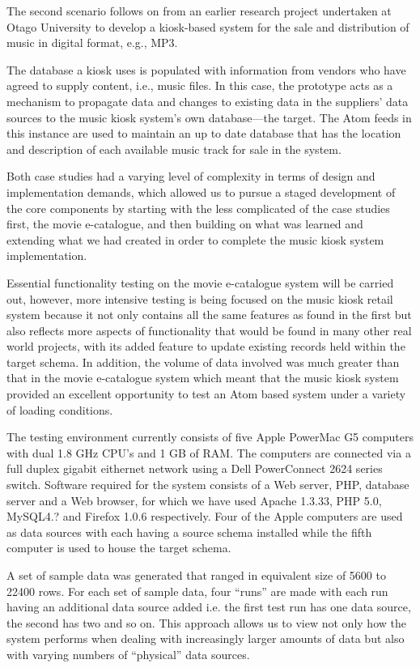\documentclass{CRPITStyle}
\begin{document}
The second scenario follows on from an earlier research project undertaken
at Otago University to develop a kiosk-based system for the sale and 
distribution of music in digital format, e.g., MP3.

The database a kiosk uses is populated with information from vendors who
have agreed to supply content, i.e., music files. In this case, the
prototype acts as a mechanism to propagate data and changes to existing
data in the suppliers' data sources to the music kiosk system's own
database---the target. The Atom feeds in this instance are used to
maintain an up to date database that has the location and description of
each available music track for sale in the system.

Both case studies had a varying level of complexity in terms of design
and implementation demands, which allowed us to pursue a staged
development of the core components by starting with the less complicated
of the case studies first, the movie e-catalogue, and then building on 
what was learned and extending what we had created in order to complete 
the music kiosk system implementation.

Essential functionality testing on the movie e-catalogue system will be
carried out, however, more intensive testing is being focused on the 
music kiosk retail system because it not only contains all the same 
features as found in the first but also reflects more aspects of 
functionality that would be found in many other real world projects, with
its added feature to update existing records held within the target schema.
In addition, the volume of data involved was much greater than that in the
movie e-catalogue system which meant that the music kiosk system provided
an excellent opportunity to test an Atom based system under a variety of 
loading conditions.

The testing environment currently consists of five Apple PowerMac G5
computers with dual 1.8 GHz CPU's and 1 GB of RAM. The computers are 
connected via a full duplex gigabit eithernet network using a Dell PowerConnect
2624 series switch. Software required for the system consists of a Web server,
PHP, database server and a Web browser, for which we have used Apache 1.3.33, 
PHP 5.0, MySQL4.? and Firefox 1.0.6 respectively. Four of the Apple computers 
are used as data sources with each having a source schema installed while the 
fifth computer is used to house the target schema. 

A set of sample data was generated that ranged in equivalent size of 5600 to
22400 rows. For each set of sample data, four ``runs'' are made with each run having
an additional data source added i.e. the first test run has one data source, the
second has two and so on. This approach allows us to view not only how the 
system performs when dealing with increasingly larger amounts of data but also
with varying numbers of ``physical'' data sources.
\end{document}
